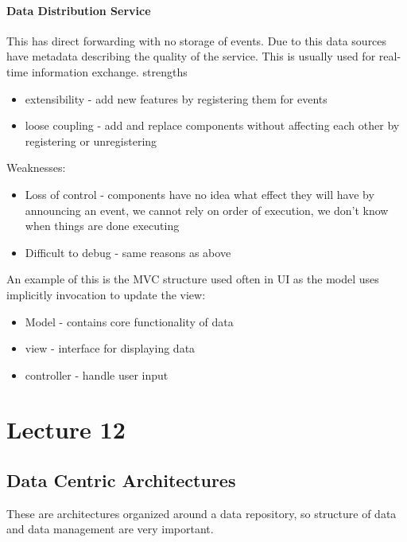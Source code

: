 \documentclass{article}
\begin{document}
\paragraph{Data Distribution Service} %
\label{par:data_distrubution_service}
This has direct forwarding with no storage of events. Due to this data sources have metadata describing the quality of the service. This is usually used for real-time information exchange.
strengths
\begin{itemize}
    \item extensibility - add new features by registering them for events
    \item loose coupling -  add and replace components without affecting each other by registering or unregistering
\end{itemize}
Weaknesses:
\begin{itemize}
    \item Loss of control - components have no idea what effect they will have by announcing an event, we cannot rely on order of execution, we don't know when things are done executing
    \item Difficult to debug - same reasons as above
\end{itemize}
An example of this is the MVC structure used often in UI as the model uses implicitly invocation to update the view:
\begin{itemize}
    \item Model - contains core functionality of data
    \item view - interface for displaying data
    \item controller - handle user input
\end{itemize}


\section*{Lecture 12} %
\label{sec:lecture_12}
\subsection*{Data Centric Architectures} %
\label{sub:data_centric_architectures}
These are architectures organized around a data repository, so structure of data and data management are very important.
\end{document}
